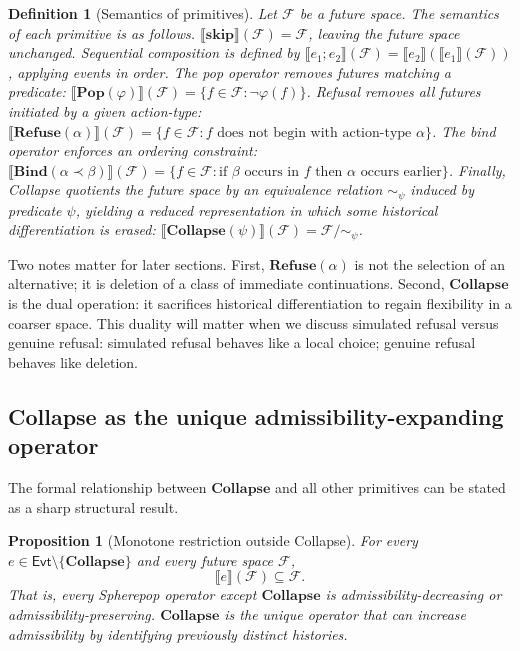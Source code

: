 \documentclass[11pt]{article}
\newtheorem{definition}{Definition}
\newtheorem{proposition}{Proposition}
\newcommand{\Future}{\mathcal{F}}
\begin{document}
\begin{definition}[Semantics of primitives]
Let $\Future$ be a future space. The semantics of each primitive is as follows.
$\llbracket \mathbf{skip} \rrbracket(\Future) = \Future$, leaving the future
space unchanged. Sequential composition is defined by
$\llbracket e_1 ; e_2 \rrbracket(\Future) =
\llbracket e_2 \rrbracket(\llbracket e_1 \rrbracket(\Future))$, applying events
in order. The pop operator removes futures matching a predicate:
$\llbracket \mathbf{Pop}(\varphi) \rrbracket(\Future) =
\{f\in \Future : \neg \varphi(f)\}$. Refusal removes all futures initiated by
a given action-type:
$\llbracket \mathbf{Refuse}(\alpha) \rrbracket(\Future) =
\{f\in \Future : f \text{ does not begin with action-type }\alpha\}$. The bind
operator enforces an ordering constraint:
$\llbracket \mathbf{Bind}(\alpha \prec \beta) \rrbracket(\Future) =
\{f\in \Future : \text{if } \beta \text{ occurs in } f \text{ then } \alpha
\text{ occurs earlier}\}$. Finally, Collapse quotients the future space by an
equivalence relation $\sim_\psi$ induced by predicate $\psi$, yielding a reduced
representation in which some historical differentiation is erased:
$\llbracket \mathbf{Collapse}(\psi) \rrbracket(\Future)
= \Future / \sim_\psi$.
\end{definition}

Two notes matter for later sections. First, $\mathbf{Refuse}(\alpha)$ is not
the selection of an alternative; it is deletion of a class of immediate
continuations. Second, $\mathbf{Collapse}$ is the dual operation: it sacrifices
historical differentiation to regain flexibility in a coarser space. This
duality will matter when we discuss simulated refusal versus genuine refusal:
simulated refusal behaves like a local choice; genuine refusal behaves like
deletion.

\subsection{Collapse as the unique admissibility-expanding operator}

The formal relationship between $\mathbf{Collapse}$ and all other primitives
can be stated as a sharp structural result.

\begin{proposition}[Monotone restriction outside Collapse]
\label{prop:monotone}
For every $e \in \mathsf{Evt} \setminus \{\mathbf{Collapse}\}$ and every
future space $\Future$,
\[
\llbracket e \rrbracket(\Future) \subseteq \Future.
\]
That is, every Spherepop operator except $\mathbf{Collapse}$ is
admissibility-decreasing or admissibility-preserving. $\mathbf{Collapse}$ is
the unique operator that can increase admissibility by identifying previously
distinct histories.
\end{proposition}
\end{document}

